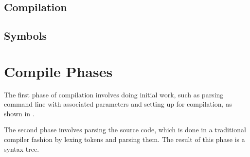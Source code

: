 \subsection{Compilation}
\subsection{Symbols}

	
	

\section{Compile Phases}


The first phase of compilation involves doing initial work, such as parsing command line with associated parameters and setting up for compilation, as shown in . 

The second phase involves parsing the source code, which is done in a traditional compiler fashion by lexing tokens and parsing them. The result of this phase is a syntax tree.

